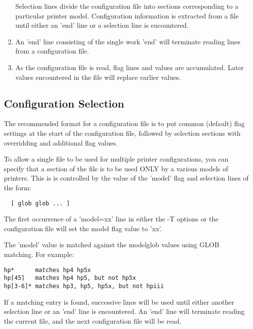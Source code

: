 \documentclass[a4paper]{article}
\begin{document}
\begin{enumerate}
Selection lines divide the configuration file into sections
corresponding to a particular printer model.   Configuration
information is extracted from a file until either an 'end' line
or a selection line is encountered.

\item An 'end' line consisting of the single work 'end' will terminate
reading lines from a configuration file.
\item  As the configuration file is read,  flag lines and values are accumulated.
Later values encountered in the file will replace earlier values.
\end{enumerate}



\subsection{Configuration Selection}

The recommended format for a  configuration file is to put common
(default) flag settings at the start of the configuration file,
followed by selection sections with overridding and additional flag
values.

To allow a single file to be used for multiple printer configurations,
you can specify that a section of the file is to be used ONLY by
a various models of printers.  This is is controlled by the value
of the 'model' flag and selection lines of the form:
\begin{tscreen}
\begin{verbatim}
  [ glob glob ... ]
\end{verbatim}
\end{tscreen}


The first occurrence of a 'model=xx' line in either the -T options
or the configuration file will set the model flag value to 'xx'.

The 'model' value is matched against the modelglob values using
GLOB matching.  For example:
\begin{tscreen}
\begin{verbatim}
hp*      matches hp4 hp5x
hp[45]   matches hp4 hp5, but not hp5x
hp[3-6]* matches hp3, hp5, hp5x, but not hpiii
\end{verbatim}
\end{tscreen}


If a matching entry is found,  successive lines will be used until
either another selection line or an 'end' line is encountered.  An
'end' line will terminate reading the current file, and the next
configuration file will be read.
\end{document}
